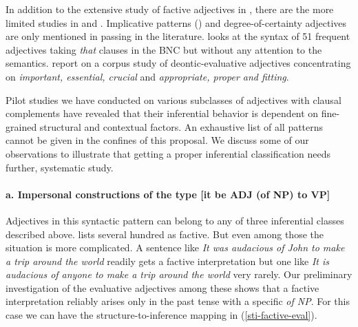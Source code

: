 \documentclass[10pt]{article}
\begin{document}
 
In addition to the extensive study of factive adjectives in \cite{norrick:1978},
there are the more limited studies in \cite{wilkinson:1970} and \cite{barker:2002}. Implicative patterns (\cite{karttunen:1971}) and degree-of-certainty adjectives are only mentioned in passing in the literature. \cite{mindt:2011} looks at the syntax of 51 frequent adjectives taking \emph{that }clauses in the BNC but without any attention to the semantics.\cite{vanlinden+davidse:2009} report on a corpus study of deontic-evaluative adjectives concentrating on \emph{important, essential, crucial} and \emph{appropriate, proper and fitting}. 

Pilot studies we have conducted on various subclasses of adjectives with clausal complements have revealed  that their inferential behavior is dependent on fine-grained structural and contextual factors. 
 An exhaustive list of all patterns cannot be given in the confines of this proposal. We discuss some of our observations to illustrate that getting a proper inferential classification  needs further, systematic study.



\vspace{-1.0em}
\paragraph{a. Impersonal constructions of the type [it be ADJ (of NP) to VP]}
 Adjectives in this syntactic pattern can belong to any of three inferential classes described above. 
\cite{norrick:1978} lists several hundred as factive. But even among those 
the situation is more complicated. A sentence like \textit{It was audacious of John to make a trip around the world} readily gets a factive interpretation but one like \textit{It is audacious of anyone to make a trip around the world} very rarely.
Our preliminary investigation of the evaluative adjectives among these shows that a factive interpretation reliably arises only in the past tense with a specific \textit{of NP}. For this case we can have the structure-to-inference mapping in (\ref{sti-factive-eval}).
\end{document}
